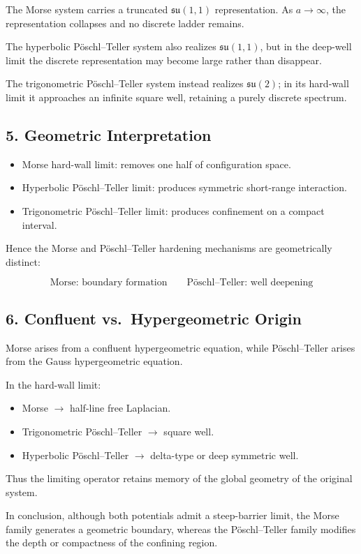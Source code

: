 \documentclass[11pt]{article}
\begin{document}
The Morse system carries a truncated
$\mathfrak{su}(1,1)$ representation.
As $a\to\infty$,
the representation collapses and no discrete ladder remains.

The hyperbolic P\"oschl--Teller system also realizes
$\mathfrak{su}(1,1)$,
but in the deep-well limit the discrete representation
may become large rather than disappear.

The trigonometric P\"oschl--Teller system instead realizes
$\mathfrak{su}(2)$;
in its hard-wall limit it approaches an infinite square well,
retaining a purely discrete spectrum.

\subsection{5. Geometric Interpretation}

\begin{itemize}
\item Morse hard-wall limit:
      removes one half of configuration space.
\item Hyperbolic P\"oschl--Teller limit:
      produces symmetric short-range interaction.
\item Trigonometric P\"oschl--Teller limit:
      produces confinement on a compact interval.
\end{itemize}

Hence the Morse and P\"oschl--Teller hardening mechanisms
are geometrically distinct:

\[
\boxed{
\text{Morse: boundary formation}
\qquad
\text{P\"oschl--Teller: well deepening}
}
\]

\subsection{6. Confluent vs.\ Hypergeometric Origin}

Morse arises from a confluent hypergeometric equation,
while P\"oschl--Teller arises from the Gauss hypergeometric equation.

In the hard-wall limit:

\begin{itemize}
\item Morse $\rightarrow$ half-line free Laplacian.
\item Trigonometric P\"oschl--Teller $\rightarrow$ square well.
\item Hyperbolic P\"oschl--Teller $\rightarrow$ delta-type or deep symmetric well.
\end{itemize}

Thus the limiting operator retains memory of
the global geometry of the original system.

\bigskip

In conclusion, although both potentials admit
a steep-barrier limit,
the Morse family generates a geometric boundary,
whereas the P\"oschl--Teller family modifies the depth
or compactness of the confining region.
\end{document}
